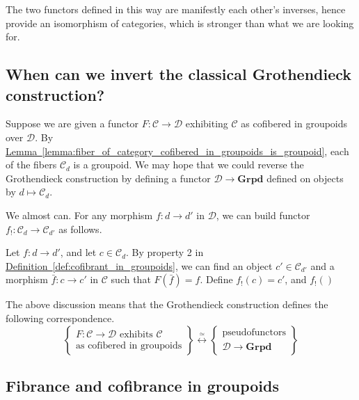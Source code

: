 \documentclass[main.tex]{subfiles}
\begin{document}
\begin{example}
  The two functors defined in this way are manifestly each other's inverses, hence provide an isomorphism of categories, which is stronger than what we are looking for.
\end{example}

\subsection{When can we invert the classical Grothendieck construction?}
\label{ssc:when_can_we_invert_the_classical_grothendieck_construction}

Suppose we are given a functor $F\colon \mathcal{C} \to \mathcal{D}$ exhibiting $\mathcal{C}$ as cofibered in groupoids over $\mathcal{D}$. By \hyperref[lemma:fiber_of_category_cofibered_in_groupoids_is_groupoid]{Lemma~\ref*{lemma:fiber_of_category_cofibered_in_groupoids_is_groupoid}}, each of the fibers $\mathcal{C}_{d}$ is a groupoid. We may hope that we could reverse the Grothendieck construction by defining a functor $\mathcal{D} \to \mathbf{Grpd}$ defined on objects by $d \mapsto \mathcal{C}_{d}$.

We almost can. For any morphism $f\colon d \to d'$ in $\mathcal{D}$, we can build functor $f_{!}\colon \mathcal{C}_{d} \to \mathcal{C}_{d'}$ as follows.

Let $f\colon d \to d'$, and let $c \in \mathcal{C}_{d}$. By property 2 in \hyperref[def:cofibrant_in_groupoids]{Definition~\ref*{def:cofibrant_in_groupoids}}, we can find an object $c' \in \mathcal{C}_{d'}$ and a morphism $\bar{f}\colon c \to c'$ in $\mathcal{C}$ such that $F(\bar{f}) = f$. Define $f_{!}(c) = c'$, and $f_{!}()$

The above discussion means that the Grothendieck construction defines the following correspondence.
\begin{equation*}
  \left\{ \substack{\text{$F\colon \mathcal{C} \to \mathcal{D}$ exhibits $\mathcal{C}$}\\\text{as cofibered in groupoids}} \right\}
  \overset{\simeq}{\longleftrightarrow} \left\{ \substack{\text{pseudofunctors}\\ \mathcal{D} \to \mathbf{Grpd}} \right\}
\end{equation*}


\subsection{Fibrance and cofibrance in groupoids}
\label{ssc:cofibrance_in_groupoids}
\end{document}
